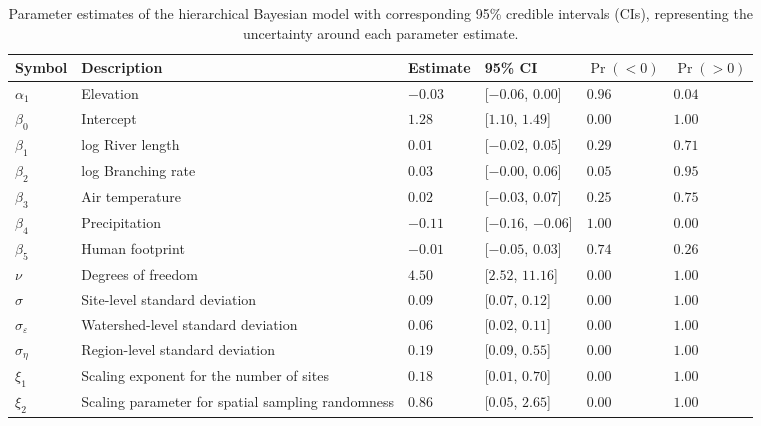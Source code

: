 \begin{table}[ht]
\centering
\caption{Parameter estimates of the hierarchical Bayesian model 
             with corresponding 95\% credible intervals (CIs), 
             representing the uncertainty around each parameter estimate.
             \label{tab:parms-est}} 
\begingroup\small
\begin{tabularx}{\textwidth}{llllll}
  \hline
Symbol & Description & Estimate & 95\% CI & $\Pr(< 0)$ & $\Pr(> 0)$ \\ 
  \hline
$\alpha_1$ & Elevation & $-0.03$ & [$-0.06$, $0.00$] & $0.96$ & $0.04$ \\ 
  $\beta_0$ & Intercept & $1.28$ & [$1.10$, $1.49$] & $0.00$ & $1.00$ \\ 
  $\beta_1$ & log River length & $0.01$ & [$-0.02$, $0.05$] & $0.29$ & $0.71$ \\ 
  $\beta_2$ & log Branching rate & $0.03$ & [$-0.00$, $0.06$] & $0.05$ & $0.95$ \\ 
  $\beta_3$ & Air temperature & $0.02$ & [$-0.03$, $0.07$] & $0.25$ & $0.75$ \\ 
  $\beta_4$ & Precipitation & $-0.11$ & [$-0.16$, $-0.06$] & $1.00$ & $0.00$ \\ 
  $\beta_5$ & Human footprint & $-0.01$ & [$-0.05$, $0.03$] & $0.74$ & $0.26$ \\ 
  $\nu$ & Degrees of freedom & $4.50$ & [$2.52$, $11.16$] & $0.00$ & $1.00$ \\ 
  $\sigma$ & Site-level standard deviation & $0.09$ & [$0.07$, $0.12$] & $0.00$ & $1.00$ \\ 
  $\sigma_{\varepsilon}$ & Watershed-level standard deviation & $0.06$ & [$0.02$, $0.11$] & $0.00$ & $1.00$ \\ 
  $\sigma_{\eta}$ & Region-level standard deviation & $0.19$ & [$0.09$, $0.55$] & $0.00$ & $1.00$ \\ 
  $\xi_{1}$ & Scaling exponent for the number of sites & $0.18$ & [$0.01$, $0.70$] & $0.00$ & $1.00$ \\ 
  $\xi_{2}$ & Scaling parameter for spatial sampling randomness & $0.86$ & [$0.05$, $2.65$] & $0.00$ & $1.00$ \\ 
   \hline
\end{tabularx}
\endgroup
\end{table}
